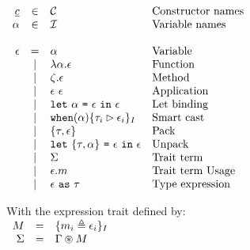 \documentclass{article}[11pt]
\newcommand{\term}[1]{\verb~#1~}
\begin{document}
    \begin{math}
        \begin{array}{rclp{5cm}}
            \underline{c} & \in  & {\cal C}                                                                & Constructor names \\
            \alpha        & \in  & {\cal I}                                                                & Variable names    \\
            \\
            \epsilon & =
            & \alpha                                                                         & Variable              \\
            & \mid & \lambda \alpha . \epsilon                                               & Function              \\
            & \mid & \zeta . \epsilon                                                        & Method              \\
            & \mid & \epsilon ~ \epsilon                                                     & Application              \\
            & \mid & \term{let}~\alpha ~ \term{=} ~ \epsilon ~ \term{in} ~ \epsilon          & Let~binding              \\
            & \mid & \term{when}(\alpha) \{ \tau_i \rhd \epsilon_i \}_I                      & Smart cast              \\
            & \mid & \{\tau, \epsilon\}                                                      & Pack              \\
            & \mid & \term{let} ~ \{\tau, \alpha\} ~ \term{=} ~ \epsilon ~\term{in}~\epsilon & Unpack              \\
            & \mid & \Sigma                                                                  & Trait~term              \\
            & \mid & \epsilon . m                                                            & Trait~term~Usage              \\
            & \mid & \epsilon ~\term{as}~ \tau                                               & Type expression
        \end{array} \\
    \end{math}

    With the expression trait defined by: \\

    \begin{math}
        \begin{array}{rclp{5cm}}
            M      & = & \{ m_i \triangleq \epsilon_i \}_I \\
            \Sigma & = & \Gamma \circledast M              \\
        \end{array}
    \end{math}
\end{document}
